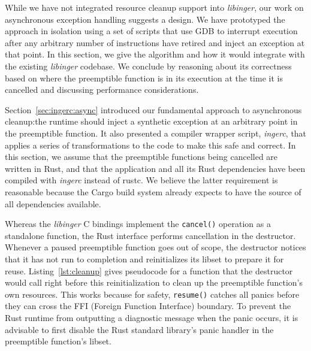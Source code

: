 While we have not integrated resource cleanup support into \textit{libinger}, our
work on asynchronous exception handling suggests a design.  We have prototyped the
approach in isolation using a set of scripts that use GDB to interrupt execution
after any arbitrary number of instructions have retired and inject an exception at
that point.  In this section, we give the algorithm and how it would integrate with
the existing \textit{libinger} codebase.  We conclude by reasoning about its
correctness based on where the preemptible function is in its execution at the time
it is cancelled and discussing performance considerations.

Section~\ref{sec:ingerc:async} introduced our fundamental approach to asynchronous
cleanup:\@ the runtime should inject a synthetic exception at an arbitrary point in
the preemptible function.  It also presented a compiler wrapper script,
\textit{ingerc}, that applies a series of transformations to the code to make this
safe and correct.  In this section, we assume that the preemptible functions being
cancelled are written in Rust, and that the application and all its Rust dependencies
have been compiled with \textit{ingerc} instead of rustc.  We believe the latter
requirement is reasonable because the Cargo build system already expects to have the
source of all dependencies available.

Whereas the \textit{libinger} C bindings implement the \texttt{cancel()} operation as
a standalone function, the Rust interface performs cancellation in the destructor.
Whenever a paused preemptible function goes out of scope, the destructor notices that
it has not run to completion and reinitializes its libset to prepare it for reuse.
Listing~\ref{lst:cleanup} gives pseudocode for a function that the destructor would
call right before this reinitialization to clean up the preemptible function's own
resources.  This works because for safety, \texttt{resume()} catches all panics
before they can cross the FFI (Foreign Function Interface) boundary.  To prevent the
Rust runtime from outputting a diagnostic message when the panic occurs, it is
advisable to first disable the Rust standard library's panic handler in the
preemptible function's libset.

